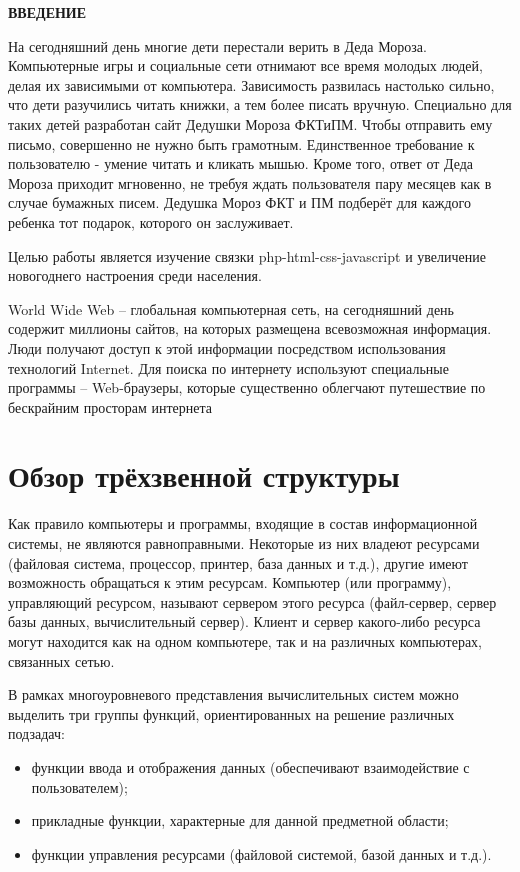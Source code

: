 \documentclass[oneside,final,14pt]{extreport}
\begin{document}
\tableofcontents
\newpage
\begin{center}
\bfseries ВВЕДЕНИЕ
\end{center}

	На сегодняшний день многие дети перестали верить в Деда Мороза. Компьютерные игры и социальные сети отнимают все время молодых людей, делая их зависимыми от компьютера. Зависимость развилась настолько сильно, что дети разучились читать книжки, а тем более писать вручную. Специально для таких детей разработан сайт Дедушки Мороза ФКТиПМ. Чтобы отправить ему письмо, совершенно не нужно быть грамотным. Единственное требование к пользователю - умение читать и кликать мышью. Кроме того, ответ от Деда Мороза приходит мгновенно, не требуя ждать пользователя пару месяцев как в случае бумажных писем. Дедушка Мороз ФКТ и ПМ подберёт для каждого ребенка тот подарок, которого он заслуживает.
	
	Целью работы является изучение связки php-html-css-javascript и увеличение новогоднего настроения среди населения. 
	
	World Wide Web – глобальная компьютерная сеть, на сегодняшний день содержит миллионы сайтов, на которых размещена всевозможная информация. Люди получают доступ к этой информации посредством использования технологий Internet. Для поиска по интернету используют специальные программы – Web-браузеры, которые существенно облегчают путешествие по бескрайним просторам интернета   
\chapter{Обзор трёхзвенной структуры}
Как правило компьютеры и программы, входящие в состав информационной системы, не являются равноправными. Некоторые из них владеют ресурсами (файловая система, процессор, принтер, база данных и т.д.), другие имеют возможность обращаться к этим ресурсам. Компьютер (или программу), управляющий ресурсом, называют сервером этого ресурса (файл-сервер, сервер базы данных, вычислительный сервер). Клиент и сервер какого-либо ресурса могут находится как на одном компьютере, так и на различных компьютерах, связанных сетью.

В рамках многоуровневого представления вычислительных систем можно выделить три группы функций, ориентированных на решение различных подзадач: 

\begin{itemize}
\item функции ввода и отображения данных (обеспечивают взаимодействие с пользователем);
\item прикладные функции, характерные для данной предметной области;
\item функции управления ресурсами (файловой системой, базой данных и т.д.).
\end{itemize}
\end{document}
